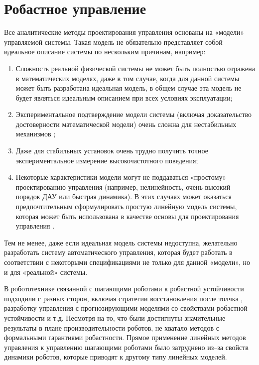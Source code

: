 \section{Робастное управление}\label{sec:ch1/sec4}
Все аналитические методы проектирования управления основаны на «модели» управляемой системы. Такая модель не обязательно представляет собой идеальное описание системы по нескольким причинам, например:
\begin{enumerate}[beginpenalty=10000]
	\item Сложность реальной физической системы не может быть полностью отражена в математических моделях, даже в том случае, когда для данной системы может быть разработана идеальная модель, в общем случае эта модель не будет являться идеальным описанием при всех условиях эксплуатации;
	\item Экспериментальное подтверждение модели системы (включая доказательство достоверности математической модели) очень сложна для нестабильных механизмов \cite{Oral2022};
	\item Даже для стабильных установок очень трудно получить точное экспериментальное измерение высокочастотного поведения;
	\item Некоторые характеристики модели могут не поддаваться «простому» проектированию управления (например, нелинейность, очень высокий порядок ДАУ или быстрая динамика). В этих случаях может оказаться предпочтительным сформулировать простую линейную модель системы, которая может быть использована в качестве основы для проектирования управления \cite{barmish1994new, Garulli2000}.
\end{enumerate}

Тем не менее, даже если идеальная модель системы недоступна, желательно разработать систему автоматического управления, которая будет работать в соответствии с некоторыми спецификациями не только для данной «модели», но и для «реальной» системы.

В робототехнике связанной с шагающими роботами к робастной устойчивости подходили с разных сторон, включая стратегии восстановления после толчка \cite{Pratt2006}, разработку управления с прогнозирующими моделями со свойствами робастной устойчивости \cite{KIM2019} и т.д. Несмотря на то, что были достигнуты значительные результаты в плане производительности роботов, не хватало методов с формальными гарантиями робастности. Прямое применение линейных методов управления к управлению шагающими роботами было затруднено из--за свойств динамики роботов, которые приводят к другому типу линейных моделей.


